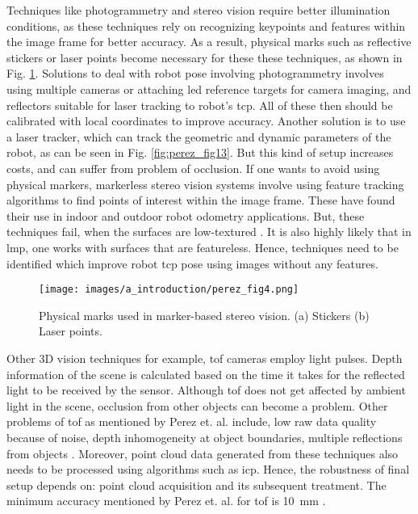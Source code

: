     \vspace{5mm}
    
    
    \noindent Techniques like photogrammetry and stereo vision require better illumination conditions, as these techniques rely on recognizing keypoints and features within the image frame for better accuracy. As a result, physical marks such as reflective stickers or laser points become necessary for these these techniques, as shown in Fig. \ref{fig:fig_perez_4}. Solutions to deal with robot pose involving photogrammetry involves using multiple cameras or attaching \gls{led} reference targets for camera imaging, and reflectors suitable for laser tracking to robot's \gls{tcp}. All of these then should be calibrated with local coordinates to improve accuracy. Another solution is to use a laser tracker, which can track the geometric and dynamic parameters of the robot, as can be seen in Fig. \ref{fig:perez_fig13}. But this kind of setup increases costs, and can suffer from problem of occlusion. If one wants to avoid using physical markers, markerless stereo vision systems involve using feature tracking algorithms to find points of interest within the image frame. These have found their use in indoor and outdoor robot odometry applications. But, these techniques fail, when the surfaces are low-textured \cite{perez}. It is also highly likely that in \Gls{lmp}, one works with surfaces that are featureless. Hence, techniques need to be identified which improve robot \gls{tcp} pose using images without any features.

    \vspace{5mm}
    \begin{figure}[h]
        \centering
        \texttt{[image: images/a\_introduction/perez\_fig4.png]}
        \caption{Physical marks used in marker-based stereo vision. (a) Stickers (b) Laser points. \cite{perez}}
        \label{fig:fig_perez_4}
    \end{figure}
    \vspace{5mm}
    
    \noindent Other 3D vision techniques for example, \gls{tof} cameras employ light pulses. Depth information of the scene is calculated based on the time it takes for the reflected light to be received by the sensor. Although \gls{tof} does not get affected by ambient light in the scene, occlusion from other objects can become a problem. Other problems of \gls{tof} as mentioned by Perez et. al. include, low raw data quality because of noise, depth inhomogeneity at object boundaries, multiple reflections from objects \cite{perez}. Moreover, point cloud data generated from these techniques also needs to be processed using algorithms such as \gls{icp}. Hence, the robustness of final setup depends on: point cloud acquisition and its subsequent treatment. The minimum accuracy mentioned by Perez et. al. for \gls{tof} is \SI{10}{\milli\meter} \cite{perez}.
    
